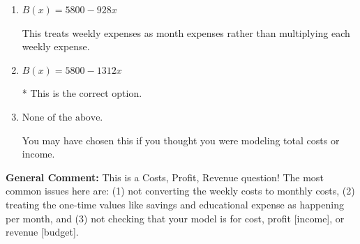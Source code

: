 \documentclass{extbook}[14pt]
\begin{document}
\begin{enumerate}
{\begin{enumerate}[label=\Alph*.]
This treats the educational expense and savings as something you get every month rather than a 1-time payment AND treats weekly expenses as month expenses rather than multiplying each weekly expense by 4.
\item \( B(x) = 5800 - 928 x \)

This treats weekly expenses as month expenses rather than multiplying each weekly expense.
\item \( B(x) = 5800 - 1312 x \)

* This is the correct option.
\item \( \text{None of the above.} \)

You may have chosen this if you thought you were modeling total costs or income.
\end{enumerate}

\textbf{General Comment:} This is a Costs, Profit, Revenue question! The most common issues here are: (1) not converting the weekly costs to monthly costs, (2) treating the one-time values like savings and educational expense as happening per month, and (3) not checking that your model is for cost, profit [income], or revenue [budget].
}
\end{enumerate}
\end{document}

